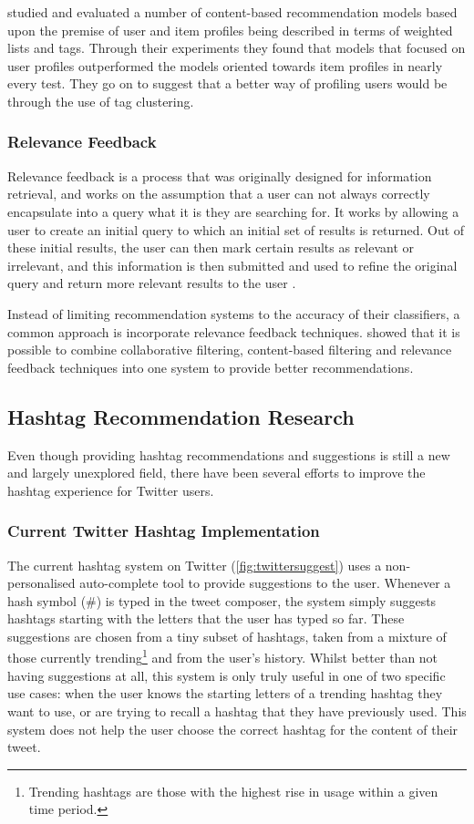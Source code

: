 \documentclass[12pt,a4paper]{article}
\begin{document}
\textcite{Cantador:2010} studied and evaluated a number of content-based recommendation models based upon the premise of user and item profiles being described in terms of weighted lists and tags. Through their experiments they found that models that focused on user profiles outperformed the models oriented towards item profiles in nearly every test. They go on to suggest that a better way of profiling users would be through the use of tag clustering.

\subsubsection{Relevance Feedback}
Relevance feedback is a process that was originally designed for information retrieval, and works on the assumption that a user can not always correctly encapsulate into a query what it is they are searching for. It works by allowing a user to create an initial query to which an initial set of results is returned. Out of these initial results, the user can then mark certain results as relevant or irrelevant, and this information is then submitted and used to refine the original query and return more relevant results to the user \parencite{Salton:1997}.

Instead of limiting recommendation systems to the accuracy of their classifiers, a common approach is incorporate relevance feedback techniques. \textcite{Utiyama:2006} showed that it is possible to combine collaborative filtering, content-based filtering and relevance feedback techniques into one system to provide better recommendations.

\subsection{Hashtag Recommendation Research}
Even though providing hashtag recommendations and suggestions is still a new and largely unexplored field, there have been several efforts to improve the hashtag experience for Twitter users.

\subsubsection{Current Twitter Hashtag Implementation}
The current hashtag system on Twitter (\autoref{fig:twittersuggest}) uses a non-personalised auto-complete tool to provide suggestions to the user. Whenever a hash symbol (\#) is typed in the tweet composer, the system simply suggests hashtags starting with the letters that the user has typed so far. These suggestions are chosen from a tiny subset of hashtags, taken from a mixture of those currently trending\footnote{Trending hashtags are those with the highest rise in usage within a given time period.} and from the user's history. Whilst better than not having suggestions at all, this system is only truly useful in one of two specific use cases: when the user knows the starting letters of a trending hashtag they want to use, or are trying to recall a hashtag that they have previously used. This system does not help the user choose the correct hashtag for the content of their tweet.
\end{document}
